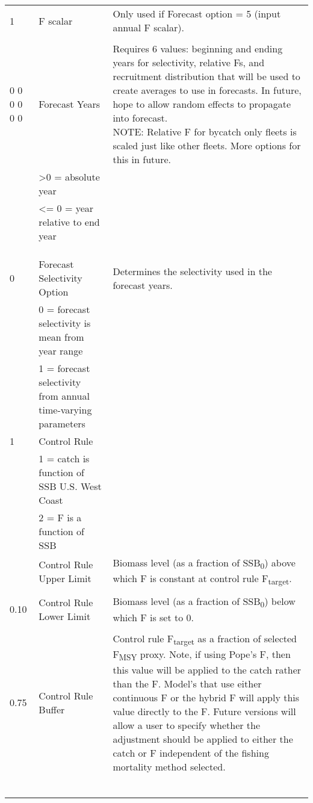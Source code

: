 \begin{landscape}
\begin{longtable}{p{3.2cm} p{7cm} p{10.8cm}}
  \hline
  1 & F scalar & \multirow{1}{1cm}[-0.1cm]{\parbox{11cm}{Only used if Forecast option = 5 (input annual F scalar).}}\\
  & & \\
  
  \hline
  0 0 0 0 0 0 & Forecast Years &  \multirow{1}{1cm}[-0.1cm]{\parbox{11cm}{Requires 6 values:  beginning and ending years for selectivity, relative Fs, and recruitment distribution that will be used to create averages to use in forecasts.  In future, hope to allow random effects to propagate into forecast.  \\NOTE:  Relative F for bycatch only fleets is scaled just like other fleets.  More options for this in future.}}\\
    & >0 = absolute year & \\
    & <= 0 = year relative to end year & \\
    \\
    \\  \\
 \hline   
 0 & Forecast Selectivity Option & Determines the selectivity used in the forecast years. \\
   & 0 = forecast selectivity is mean from year range & \\
   & 1 = forecast selectivity from annual time-varying parameters & \\

 \hline   
 1 & Control Rule & \\
   & 1 = catch is function of SSB U.S. West Coast & \\
   & 2 = F is a function of SSB & \\
   
 \pagebreak
 0.40 & Control Rule Upper Limit & \multirow{1}{1cm}[-0.1cm]{\parbox{11cm}{Biomass level (as a fraction of SSB\textsubscript{0}) above which F is constant at control rule F\textsubscript{target}.}} \\
   &  & \\
 
 0.10 & Control Rule Lower Limit & \multirow{1}{1cm}[-0.1cm]{\parbox{11cm}{Biomass level (as a fraction of SSB\textsubscript{0}) below which F is set to 0.}} \\
   &  & \\
 
 \hline
 0.75 & Control Rule Buffer & \multirow{1}{1cm}[-0.1cm]{\parbox{11cm}{Control rule F\textsubscript{target} as a fraction of selected F\textsubscript{MSY} proxy. Note, if using Pope's F, then this value will be applied to the catch rather than the F.  Model's that use either continuous F or the hybrid F will apply this value directly to the F.  Future versions will allow a user to specify whether the adjustment should be applied to either the catch or F independent of the fishing mortality method selected.}} \\ 
  & & \\
  & & \\
  & & \\
  & & \\
  & & \\ \\
 

\end{longtable}
\end{landscape}
